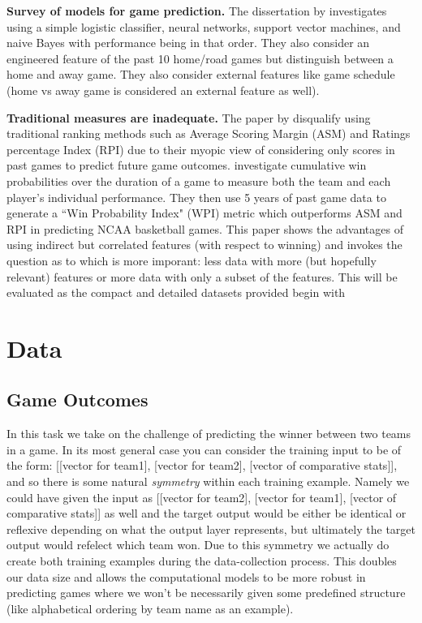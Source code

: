 \documentclass{article} %
\begin{document}
\textbf{Survey of models for game prediction.}  The dissertation by \citet{cao2012sports} investigates using a simple logistic classifier, neural networks, support vector machines, and naive Bayes with performance being in that order.  They also consider an engineered feature of the past 10 home/road games but distinguish between a home and away game.  They also consider external features like game schedule (home vs away game is considered an external feature as well).

\textbf{Traditional measures are inadequate.}  The paper by \citet{bashuk2012using} disqualify using traditional ranking methods such as Average Scoring Margin (ASM) and Ratings percentage Index (RPI) due to their myopic view of considering only scores in past games to predict future game outcomes.  \citet{bashuk2012using} investigate cumulative win probabilities over the duration of a game to measure both the team and each player's individual performance.  They then use 5 years of past game data to generate a ``Win Probability Index" (WPI) metric which outperforms ASM and RPI in predicting NCAA basketball games.  This paper shows the advantages of using indirect but correlated features (with respect to winning) and invokes the question as to which is more imporant: less data with more (but hopefully relevant) features or more data with only a subset of the features.  This will be evaluated as the compact and detailed datasets provided begin with


\section{Data}
\label{sec:data}

\subsection{Game Outcomes}
\label{sec:data-winner}

In this task we take on the challenge of predicting the winner between two teams in a game.  In its most general case you can consider the training input to be of the form: [[vector for team1], [vector for team2], [vector of comparative stats]], and so there is some natural \textit{symmetry} within each training example.  Namely we could have given the input as [[vector for team2], [vector for team1], [vector of comparative stats]] as well and the target output would be either be identical or reflexive depending on what the output layer represents, but ultimately the target output would refelect which team won.  Due to this symmetry we actually do create both training examples during the data-collection process.  This doubles our data size and allows the computational models to be more robust in predicting games where we won't be necessarily given some predefined structure (like alphabetical ordering by team name as an example).
\end{document}

